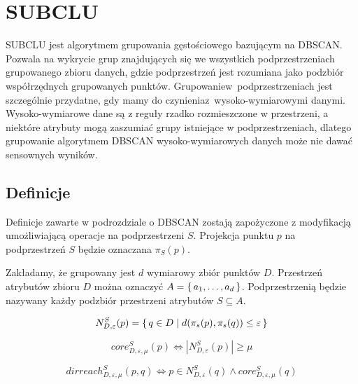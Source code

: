 \section{SUBCLU}

SUBCLU \cite{subclu} jest algorytmem grupowania gęstościowego bazującym na \linebreak DBSCAN. Pozwala na wykrycie grup znajdujących się we wszystkich podprzestrzeniach grupowanego zbioru danych, gdzie podprzestrzeń jest rozumiana jako podzbiór współrzędnych grupowanych punktów. Grupowanie\linebreak \mbox{w podprzestrzeniach} jest szczególnie przydatne, gdy mamy do czynienia\linebreak \mbox{z wysoko-wymiarowymi} danymi. Wysoko-wymiarowe dane są z reguły rzadko rozmieszczone w przestrzeni, a niektóre atrybuty mogą zaszumiać grupy istniejące w podprzestrzeniach, dlatego grupowanie algorytmem DBSCAN wysoko-wymiarowych danych może nie dawać sensownych wyników.

\subsection{Definicje}
Definicje zawarte w podrozdziale o DBSCAN zostają zapożyczone z modyfikacją umożliwiającą operacje na podprzestrzeni $ S $. Projekcja punktu $ p $ na podprzestrzeń $ S $ będzie oznaczana $\pi_S(p) $. 
\smallskip

\setcounter{definitioncounter}{0}
\newline
Zakładamy, że grupowany jest $ d $ wymiarowy zbiór punktów $ D $. Przestrzeń atrybutów zbioru $ D $ można oznaczyć $ A=\set{a_1,\dots,a_d} $. Podprzestrzenią będzie nazywany każdy podzbiór przestrzeni atrybutów $ S \subseteq A $.
\smallskip

\begin{equation}
	N^S_{D,\varepsilon}(p) = \set{q \in D | d(\pi_s(p), \pi_s(q)) \le \varepsilon}
\end{equation}

\begin{equation}
	core^S_{D,\varepsilon,\mu}(p) \iff |N^S_{D,\varepsilon}(p)| \ge \mu
\end{equation}

\begin{equation}
	dirreach^S_{D,\varepsilon,\mu}(p, q) \iff p \in N^S_{D,\varepsilon}(q) \land core^S_{D,\varepsilon,\mu}(q)
\end{equation}

